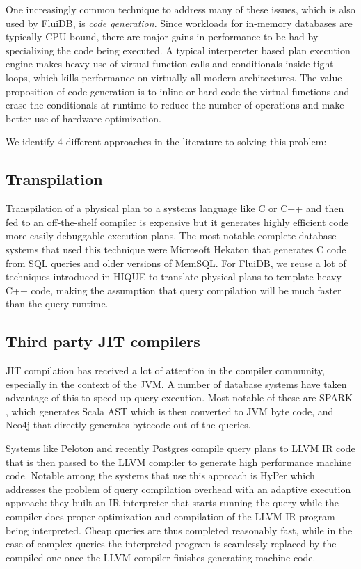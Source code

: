 One increasingly common technique to address many of these issues,
which is also used by FluiDB, is \emph{code generation}. Since
workloads for in-memory databases are typically CPU bound, there are
major gains in performance to be had by specializing the code being
executed. A typical interpereter based plan execution engine makes
heavy use of virtual function calls and conditionals inside tight
loops, which kills performance on virtually all modern
architectures. The value proposition of code generation is to inline
or hard-code the virtual functions and erase the conditionals at
runtime to reduce the number of operations and make better use of
hardware optimization.

We identify 4 different approaches in the literature to solving this
problem:

\subsection{Transpilation}
\label{sec:transpilation}

Transpilation of a physical plan to a systems language like C or C++
and then fed to an off-the-shelf compiler
\cite{krikellasGeneratingCodeHolistic2010} is expensive but it
generates highly efficient code more easily debuggable execution
plans. The most notable complete database systems that used this
technique were Microsoft Hekaton that generates C code from SQL
queries and older versions of MemSQL. For FluiDB, we reuse a lot of
techniques introduced in HIQUE
\cite{krikellasGeneratingCodeHolistic2010} to translate physical plans
to template-heavy C++ code, making the assumption that query
compilation will be much faster than the query runtime.

\subsection{Third party JIT compilers}

JIT compilation has received a lot of attention in the compiler
community, especially in the context of the JVM. A number of database
systems have taken advantage of this to speed up query execution. Most
notable of these are SPARK \cite{armbrustSparkSQLRelational2015}, which
generates Scala AST which is then converted to JVM byte code, and
Neo4j that directly generates bytecode out of the queries.

Systems like Peloton \cite{menonRelaxedOperatorFusion2017} and
recently Postgres \cite{sharyginQueryCompilationPostgreSQL2017}
compile query plans to LLVM IR code that is then passed to the LLVM
compiler to generate high performance machine code. Notable among the
systems that use this approach is HyPer
\cite{neumannEvolutionCompilingQueryEngine} which addresses the
problem of query compilation overhead with an adaptive execution
approach: they built an IR interpreter that starts running the query
while the compiler does proper optimization and compilation of the
LLVM IR program being interpreted. Cheap queries are thus completed
reasonably fast, while in the case of complex queries the interpreted
program is seamlessly replaced by the compiled one once the LLVM
compiler finishes generating machine code.

